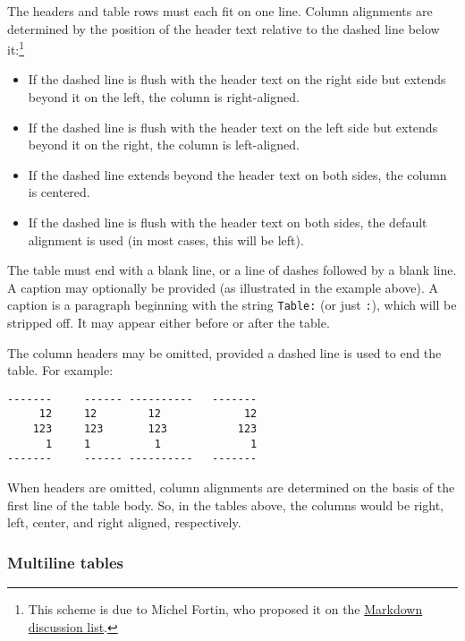 \documentclass[]{article}
\begin{document}
The headers and table rows must each fit on one line. Column alignments
are determined by the position of the header text relative to the dashed
line below it:\footnote{This scheme is due to Michel Fortin, who
  proposed it on the
  \href{http://six.pairlist.net/pipermail/markdown-discuss/2005-March/001097.html}{Markdown
  discussion list}.}

\begin{itemize}
\itemsep1pt\parskip0pt
\item
  If the dashed line is flush with the header text on the right side but
  extends beyond it on the left, the column is right-aligned.
\item
  If the dashed line is flush with the header text on the left side but
  extends beyond it on the right, the column is left-aligned.
\item
  If the dashed line extends beyond the header text on both sides, the
  column is centered.
\item
  If the dashed line is flush with the header text on both sides, the
  default alignment is used (in most cases, this will be left).
\end{itemize}

The table must end with a blank line, or a line of dashes followed by a
blank line. A caption may optionally be provided (as illustrated in the
example above). A caption is a paragraph beginning with the string
\texttt{Table:} (or just \texttt{:}), which will be stripped off. It may
appear either before or after the table.

The column headers may be omitted, provided a dashed line is used to end
the table. For example:

\begin{verbatim}
-------     ------ ----------   -------
     12     12        12             12
    123     123       123           123
      1     1          1              1
-------     ------ ----------   -------
\end{verbatim}

When headers are omitted, column alignments are determined on the basis
of the first line of the table body. So, in the tables above, the
columns would be right, left, center, and right aligned, respectively.

\subsubsection{Multiline tables}\label{multiline-tables}
\end{document}
